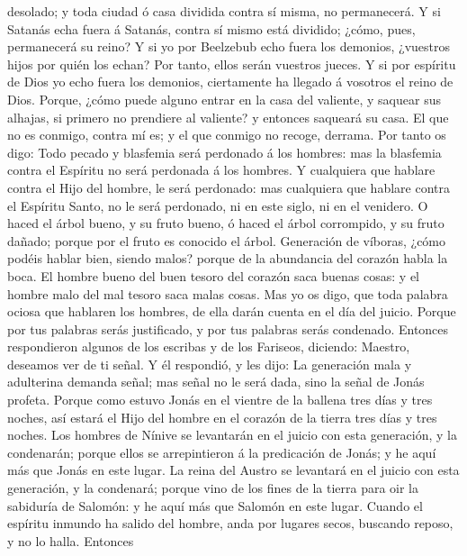 desolado; y toda ciudad ó casa dividida contra sí misma, no permanecerá.
 Y si Satanás echa fuera á Satanás, contra sí mismo está
dividido; ¿cómo, pues, permanecerá su reino?  Y si yo por
Beelzebub echo fuera los demonios, ¿vuestros hijos por quién los echan?
Por tanto, ellos serán vuestros jueces.  Y si por espíritu
de Dios yo echo fuera los demonios, ciertamente ha llegado á vosotros el
reino de Dios.  Porque, ¿cómo puede alguno entrar en la
casa del valiente, y saquear sus alhajas, si primero no prendiere al
valiente? y entonces saqueará su casa.  El que no es
conmigo, contra mí es; y el que conmigo no recoge, derrama.
 Por tanto os digo: Todo pecado y blasfemia será perdonado
á los hombres: mas la blasfemia contra el Espíritu no será perdonada á
los hombres.  Y cualquiera que hablare contra el Hijo del
hombre, le será perdonado: mas cualquiera que hablare contra el Espíritu
Santo, no le será perdonado, ni en este siglo, ni en el venidero.
 O haced el árbol bueno, y su fruto bueno, ó haced el árbol
corrompido, y su fruto dañado; porque por el fruto es conocido el árbol.
 Generación de víboras, ¿cómo podéis hablar bien, siendo
malos? porque de la abundancia del corazón habla la boca. 
El hombre bueno del buen tesoro del corazón saca buenas cosas: y el
hombre malo del mal tesoro saca malas cosas.  Mas yo os
digo, que toda palabra ociosa que hablaren los hombres, de ella darán
cuenta en el día del juicio.  Porque por tus palabras serás
justificado, y por tus palabras serás condenado.  Entonces
respondieron algunos de los escribas y de los Fariseos, diciendo:
Maestro, deseamos ver de ti señal.  Y él respondió, y les
dijo: La generación mala y adulterina demanda señal; mas señal no le
será dada, sino la señal de Jonás profeta.  Porque como
estuvo Jonás en el vientre de la ballena tres días y tres noches, así
estará el Hijo del hombre en el corazón de la tierra tres días y tres
noches.  Los hombres de Nínive se levantarán en el juicio
con esta generación, y la condenarán; porque ellos se arrepintieron á la
predicación de Jonás; y he aquí más que Jonás en este lugar.
 La reina del Austro se levantará en el juicio con esta
generación, y la condenará; porque vino de los fines de la tierra para
oir la sabiduría de Salomón: y he aquí más que Salomón en este lugar.
 Cuando el espíritu inmundo ha salido del hombre, anda por
lugares secos, buscando reposo, y no lo halla.  Entonces
